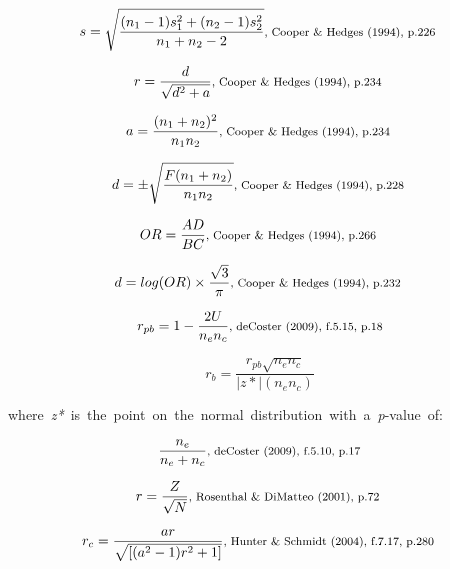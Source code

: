 \documentclass{article}
\begin{document}
\begin{equation*}
s={\sqrt {\frac {(n_{1}-1)s_{1}^{2}+(n_{2}-1)s_{2}^{2}}{n_{1}+n_{2}-2}}} \mbox{\footnotesize, Cooper \& Hedges (1994), p.226 } 
\end{equation*}

\begin{equation*}
r=\frac{d}{\sqrt{d^{2}+a}} \mbox{\footnotesize, Cooper \& Hedges (1994), p.234 }
\end{equation*}

\begin{equation*}
a=\frac{(n_{1}+n_{2})^{2}}{n_{1}n_{2}} \mbox{\footnotesize, Cooper \& Hedges (1994), p.234 }
\end{equation*}

\begin{equation*}
d=\pm{\sqrt {\frac {F(n_{1}+n_{2})}{n_{1}n_{2}}}} \mbox{\footnotesize, Cooper \& Hedges (1994), p.228 }
\end{equation*}

\begin{equation*}
OR={\frac {AD}{BC}} \mbox{\footnotesize, Cooper \& Hedges (1994), p.266 }
\end{equation*}

\begin{equation*}
d=log(OR) \times {\frac {\sqrt{3}}{\pi}} \mbox{\footnotesize, Cooper \& Hedges (1994), p.232 }
\end{equation*}

\begin{equation*}
r_{pb} = 1 - \frac{2U}{n_{e}n_{c}} \mbox{\footnotesize, deCoster (2009), f.5.15, p.18}
\end{equation*}

\begin{equation*}
r_{b} = \frac{r_{pb}\sqrt{n_{e}n_{c}}}{|z*|(n_{e}n_{c})}
\end{equation*}

\mbox {\footnotesize where \textit{z*} is the point on the normal distribution with a \textit{p}-value of: }

\begin{equation*}
\frac{n_{e}}{n_{e}+n_{c}} \mbox{\footnotesize, deCoster (2009), f.5.10, p.17}
\end{equation*}

\begin{equation*}
r= \frac{Z}{\sqrt{N}} \mbox{\footnotesize, Rosenthal \& DiMatteo (2001), p.72 }
\end{equation*}

\begin{equation*}
r_{c} = \frac{ar}{\sqrt{[(a^{2}-1)r^{2}+1]}}  \mbox{\footnotesize, Hunter \& Schmidt (2004), f.7.17, p.280 }
\end{equation*}
\end{document}
